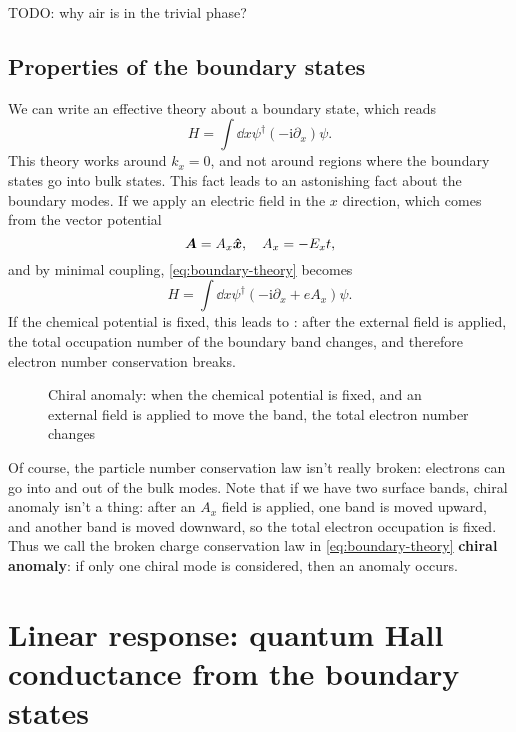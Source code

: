 \documentclass[hyperref, a4paper]{article}
\newcommand*{\ii}{\mathrm{i}}
\newcommand*{\concept}[1]{{\textbf{#1}}}
\begin{document}
TODO: why air is in the trivial phase?

\subsection{Properties of the boundary states}

We can write an effective theory about a boundary state, which reads 
\begin{equation}
    H = \int \dd{x} \psi^\dagger (- \ii \partial_x) \psi.
    \label{eq:boundary-theory}
\end{equation}
This theory works around $k_{x} = 0$, 
and not around regions where the boundary states go into bulk states.
This fact leads to an astonishing fact about the boundary modes.
If we apply an electric field in the $x$ direction, 
which comes from the vector potential 
\begin{equation}
    \vb*{A} = A_x \vu*{x}, \quad A_x = - E_x t,
\end{equation}
and by minimal coupling, \eqref{eq:boundary-theory} becomes 
\begin{equation}
    H = \int \dd{x} \psi^\dagger (- \ii \partial_x + e A_x) \psi.
\end{equation}
If the chemical potential is fixed, 
this leads to :
after the external field is applied, 
the total occupation number of the boundary band changes,
and therefore electron number conservation breaks.

\begin{figure}
    \centering
    
    \caption{Chiral anomaly: when the chemical potential is fixed, 
    and an external field is applied to move the band, 
    the total electron number changes}
    \label{fig:chiral-anomaly}
\end{figure}

Of course, the particle number conservation law isn't really broken:
electrons can go into and out of the bulk modes.
Note that if we have two surface bands, 
chiral anomaly isn't a thing: 
after an $A_x$ field is applied, 
one band is moved upward, 
and another band is moved downward, 
so the total electron occupation is fixed.
Thus we call the broken charge conservation law in \eqref{eq:boundary-theory}
\concept{chiral anomaly}:
if only one chiral mode is considered,
then an anomaly occurs.

\section{Linear response: quantum Hall conductance from the boundary states}
\end{document}
